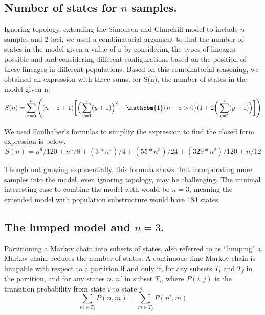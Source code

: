 \documentclass[11pt,oneside]{amsart}
\begin{document}
\subsection{Number of states for $n$ samples.}

Ignoring topology, extending the Simonsen and Churchill model to include $n$ samples and 2 loci,  we used a combinatorial argument to find the number of states in the model given a value of n by considering the types of lineages possible and and considering different configurations based on the position of these lineages in different populations. Based on this combinatorial reasoning, we obtained an expression with three sums, for S(n), the number of states in the model given n:
\begin{equation}
S(n) = \sum^{n}_{z = 0} \Bigg( (n-z+1)\bigg[\Big(\sum^{z}_{y = 1} (y+1)\Big)^2 + \mathbbm{1}\{n-z > 0\}(1+2\bigg(\sum^z_{y = 1}(y+1)\Big) \bigg] \Bigg)
\label{Eqn: combinatorial count}
\end{equation}

We used Faulhaber’s formulas to simplify the expression to find the closed form expression is below.
\begin{equation}
S(n) = n^6/120+n^5/8+(3*n^4)/4+(55*n^3)/24+(329*n^2)/120+n/12
\label{Eqn: combinatorial count Fauhaber formula}
\end{equation}

Though not growing exponentially, this formula shows that incorporating more samples into the model, even ignoring topology, may be challenging. The minimal interesting case to combine the model with \cite{SlatkinPollack2008} would be $n = 3$, meaning the extended \cite{SimonsenChurchill1997} model with population substructure would have 184 states. %

\subsection{The lumped model and $n = 3$.}

Partitioning a Markov chain into subsets of states, also referred to as ``lumping" a Markov chain, reduces the number of states. A continuous-time Markov chain is lumpable with respect to a partition if and only if, for any subsets $T_i$ and $T_j$ in the partition, and for any states $n$, $n'$ in subset $T_i$, where $P(i,j)$ is the transition probability from state $i$ to state $j$,
\begin{equation}
\sum_{m \in T_j} P(n, m) = \sum_{m \in T_j} P(n', m)
\label{Eqn: lumpability}
\end{equation}
\end{document}
